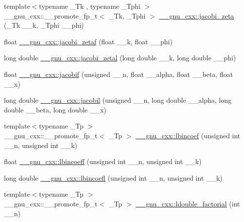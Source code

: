 \begin{DoxyCompactItemize}
\item 
{\footnotesize template$<$typename \+\_\+\+Tk , typename \+\_\+\+Tphi $>$ }\\\+\_\+\+\_\+gnu\+\_\+cxx\+::\+\_\+\+\_\+promote\+\_\+fp\+\_\+t$<$ \+\_\+\+Tk, \+\_\+\+Tphi $>$ \hyperlink{group__gnu__math__spec__func_gafe1fc209cfe90ceee3b42e077a922045}{\+\_\+\+\_\+gnu\+\_\+cxx\+::jacobi\+\_\+zeta} (\+\_\+\+Tk \+\_\+\+\_\+k, \+\_\+\+Tphi \+\_\+\+\_\+phi)
\item 
float \hyperlink{group__gnu__math__spec__func_gaedb6b352331c67b9dea73660e2045668}{\+\_\+\+\_\+gnu\+\_\+cxx\+::jacobi\+\_\+zetaf} (float \+\_\+\+\_\+k, float \+\_\+\+\_\+phi)
\item 
long double \hyperlink{group__gnu__math__spec__func_ga9db158df9459aa12c840724338753913}{\+\_\+\+\_\+gnu\+\_\+cxx\+::jacobi\+\_\+zetal} (long double \+\_\+\+\_\+k, long double \+\_\+\+\_\+phi)
\item 
float \hyperlink{group__gnu__math__spec__func_ga450db12e06d6993d169afab5b3f6d0b8}{\+\_\+\+\_\+gnu\+\_\+cxx\+::jacobif} (unsigned \+\_\+\+\_\+n, float \+\_\+\+\_\+alpha, float \+\_\+\+\_\+beta, float \+\_\+\+\_\+x)
\item 
long double \hyperlink{group__gnu__math__spec__func_ga2898a5ebf451eaf259ecfcdd171aa72b}{\+\_\+\+\_\+gnu\+\_\+cxx\+::jacobil} (unsigned \+\_\+\+\_\+n, long double \+\_\+\+\_\+alpha, long double \+\_\+\+\_\+beta, long double \+\_\+\+\_\+x)
\item 
{\footnotesize template$<$typename \+\_\+\+Tp $>$ }\\\+\_\+\+\_\+gnu\+\_\+cxx\+::\+\_\+\+\_\+promote\+\_\+fp\+\_\+t$<$ \+\_\+\+Tp $>$ \hyperlink{group__gnu__math__spec__func_gab6a2243313b6286cbd466c96fc7f69ed}{\+\_\+\+\_\+gnu\+\_\+cxx\+::lbincoef} (unsigned int \+\_\+\+\_\+n, unsigned int \+\_\+\+\_\+k)
\item 
float \hyperlink{group__gnu__math__spec__func_gab48439faacd87f02d088a04e7cee0853}{\+\_\+\+\_\+gnu\+\_\+cxx\+::lbincoeff} (unsigned int \+\_\+\+\_\+n, unsigned int \+\_\+\+\_\+k)
\item 
long double \hyperlink{group__gnu__math__spec__func_gab5b5d92a2a522aaef999106f5d602163}{\+\_\+\+\_\+gnu\+\_\+cxx\+::lbincoefl} (unsigned int \+\_\+\+\_\+n, unsigned int \+\_\+\+\_\+k)
\item 
{\footnotesize template$<$typename \+\_\+\+Tp $>$ }\\\+\_\+\+\_\+gnu\+\_\+cxx\+::\+\_\+\+\_\+promote\+\_\+fp\+\_\+t$<$ \+\_\+\+Tp $>$ \hyperlink{group__gnu__math__spec__func_ga31ca8e7a5b1f5c883e727ed9c053edd8}{\+\_\+\+\_\+gnu\+\_\+cxx\+::ldouble\+\_\+factorial} (int \+\_\+\+\_\+n)

\end{DoxyCompactItemize}

